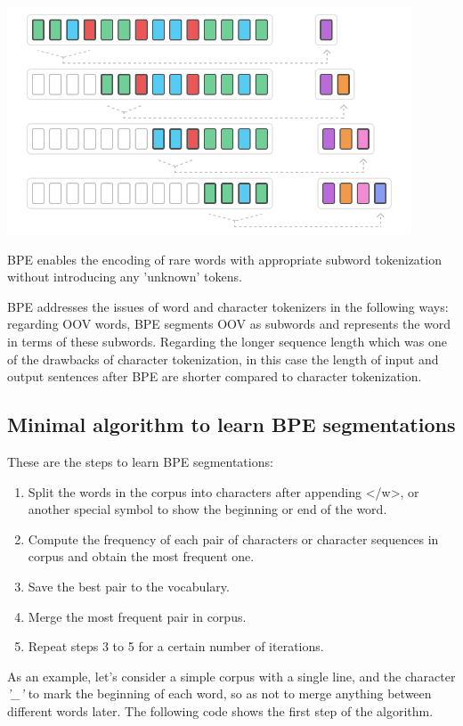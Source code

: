 \begin{center}
\includegraphics[width=12cm]{figures/bpe.png}
\end{center}

BPE enables the encoding of rare words with appropriate subword tokenization without introducing any 'unknown' tokens.

BPE addresses the issues of word and character tokenizers in the following ways: regarding OOV words, BPE segments OOV as subwords and represents the word in terms of these subwords. Regarding the longer sequence length which was one of the drawbacks of character tokenization, in this case the length of input and output sentences after BPE are shorter compared to character tokenization.

\subsection{Minimal algorithm to learn BPE segmentations}

These are the steps to learn BPE segmentations:

\begin{enumerate}
    \item Split the words in the corpus into characters after appending </w>, or another special symbol to show the beginning or end of the word.
    \item Compute the frequency of each pair of characters or character sequences in corpus and obtain the most frequent one.
    \item Save the best pair to the vocabulary.
    \item Merge the most frequent pair in corpus.
    \item Repeat steps 3 to 5 for a certain number of iterations.
\end{enumerate}

As an example, let's consider a simple corpus with a single line, and the character \emph{'\_'} to mark the beginning of each word, so as not to merge anything between different words later. The following code shows the first step of the algorithm.

